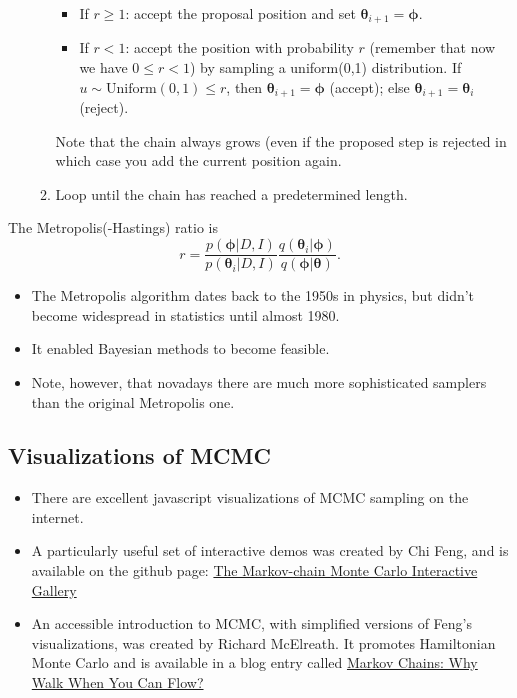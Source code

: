 \documentclass[%
oneside,                 %
final,                   %
10pt]{article}
\begin{document}
\begin{enumerate}
\begin{enumerate}
\begin{itemize}
    \item If $r \geq 1$: accept the proposal position and set $\boldsymbol{\theta}_{i+1} = \boldsymbol{\phi}$.

    \item If $r < 1$: accept the position with probability $r$ (remember that now we have $0 \leq r < 1$) by sampling a uniform(0,1) distribution. If $u \sim \mathrm{Uniform}(0,1) \leq r$, then $\boldsymbol{\theta}_{i+1} = \boldsymbol{\phi}$ (accept); else $\boldsymbol{\theta}_{i+1} = \boldsymbol{\theta}_i$ (reject).
\end{itemize}

\noindent
    Note that the chain always grows (even if the proposed step is rejected in which case you add the current position again.

 \item Loop until the chain has reached a predetermined length.
\end{enumerate}

\noindent
\end{enumerate}

\noindent
The Metropolis(-Hastings) ratio is
    \[
    r = \frac{p( \boldsymbol{\phi} | D,I)}{p( \boldsymbol{\theta}_i | D,I)}
    \frac{q( \boldsymbol{\theta}_i | \boldsymbol{\phi} )}{q( \boldsymbol{\phi} | \boldsymbol{\theta} )}.
    \]

\begin{itemize}
\item The Metropolis algorithm dates back to the 1950s in physics, but didn't become widespread in statistics until almost 1980.

\item It enabled Bayesian methods to become feasible.

\item Note, however, that novadays there are much more sophisticated samplers than the original Metropolis one.
\end{itemize}

\noindent
\subsection{Visualizations of MCMC}
\begin{itemize}
\item There are excellent javascript visualizations of MCMC sampling on the internet.

\item A particularly useful set of interactive demos was created by Chi Feng, and is available on the github page: \href{{https://chi-feng.github.io/mcmc-demo/}}{The Markov-chain Monte Carlo Interactive Gallery}

\item An accessible introduction to MCMC, with simplified versions of Feng's visualizations, was created by Richard McElreath. It promotes Hamiltonian Monte Carlo and is available in a blog entry called \href{{http://elevanth.org/blog/2017/11/28/build-a-better-markov-chain/}}{Markov Chains: Why Walk When You Can Flow?} 
\end{itemize}
\end{document}
